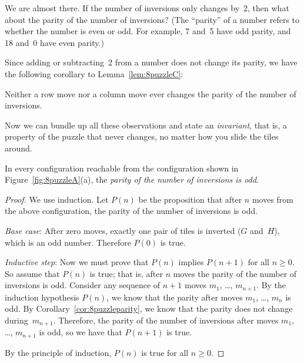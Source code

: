 We are almost there.  If the number of inversions only changes by~2,
then what about the parity of the number of inversions?  (The
``parity'' of a number refers to whether the number is even or odd.
For example, 7 and~5 have odd parity, and 18 and~0 have even parity.)

Since adding or subtracting~2 from a number does not change its
parity, we have the following corollary to Lemma~\ref{lem:8puzzleC}:
\begin{corollary}\label{cor:8puzzleparity}
Neither a row move nor a column move ever changes the parity of the number
of inversions.
\end{corollary}

Now we can bundle up all these observations and state an
\emph{invariant}, that is, a property of the puzzle that never
changes, no matter how you slide the tiles around.

\begin{lemma}\label{lem:8puzzleD}
In every configuration reachable from the configuration shown in
Figure~\ref{fig:8puzzleA}(a), the \emph{parity of the number of inversions
  is odd}.
\end{lemma}

\begin{proof}
We use induction.  Let $P(n)$ be the proposition that after $n$ moves
from the above configuration, the parity of the number of inversions
is odd.

\emph{Base case}: After zero moves, exactly one pair of tiles is
inverted ($G$ and~$H$), which is an odd number.  Therefore $P(0)$ is
true.

\emph{Inductive step}:
Now we must prove that $P(n)$ implies $P(n+1)$ for all $n \ge 0$.  So
assume that $P(n)$ is true; that is, after $n$ moves the parity of the
number of inversions is odd.  Consider any sequence of $n+1$ moves
$m_1$, \dots, $m_{n+1}$.  By the induction hypothesis $P(n)$, we know
that the parity after moves $m_1$, \dots, $m_{n}$ is odd.  By
Corollary~\ref{cor:8puzzleparity}, we know that the parity does not
change during~$m_{n+1}$.  Therefore, the parity of the number of
inversions after moves $m_1$, \dots, $m_{n+1}$ is odd, so we have that
$P(n + 1)$ is true.

By the principle of induction, $P(n)$ is true for all $n \ge 0$.
\end{proof}

